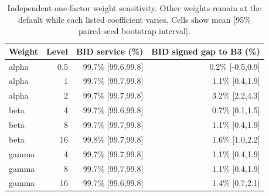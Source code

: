 \begin{table}[h!]
\centering\scriptsize
\caption{Independent one-factor weight sensitivity. Other weights remain at the default while each listed coefficient varies. Cells show mean [95\% paired-seed bootstrap interval].}
\label{tab:weight-sensitivity}
\setlength{\tabcolsep}{3pt}
\begin{tabular}{lrrr}
\toprule
Weight & Level & BID service (\%) & BID signed gap to B3 (\%) \\
\midrule
alpha & 0.5 & 99.7\% [99.6,99.8] & 0.2\% [-0.5,0.9] \\
alpha & 1 & 99.7\% [99.7,99.8] & 1.1\% [0.4,1.9] \\
alpha & 2 & 99.7\% [99.7,99.8] & 3.2\% [2.2,4.3] \\
beta & 4 & 99.7\% [99.6,99.8] & 0.7\% [0.1,1.5] \\
beta & 8 & 99.7\% [99.7,99.8] & 1.1\% [0.4,1.9] \\
beta & 16 & 99.8\% [99.7,99.8] & 1.6\% [1.0,2.2] \\
gamma & 4 & 99.7\% [99.7,99.8] & 1.1\% [0.4,1.9] \\
gamma & 8 & 99.7\% [99.7,99.8] & 1.1\% [0.4,1.9] \\
gamma & 16 & 99.7\% [99.6,99.8] & 1.4\% [0.7,2.1] \\
\bottomrule
\end{tabular}
\end{table}
